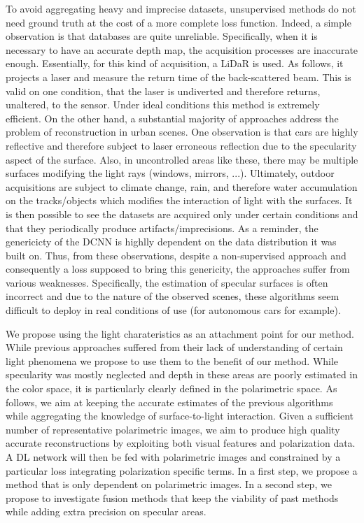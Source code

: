 To avoid aggregating heavy and imprecise datasets, unsupervised methods do not need ground truth at the cost of a more complete loss function. Indeed, a simple observation is that databases are quite unreliable. Specifically, when it is necessary to have an accurate depth map, the acquisition processes are inaccurate enough. Essentially, for this kind of acquisition, a LiDaR is used. As follows, it projects a laser and measure the return time of the back-scattered beam. This is valid on one condition, that the laser is undiverted and therefore returns, unaltered, to the sensor. Under ideal conditions this method is extremely efficient. On the other hand, a substantial majority of approaches address the problem of reconstruction in urban scenes. One observation is that cars are highly reflective and therefore subject to laser erroneous reflection due to the specularity aspect of the surface. Also, in uncontrolled areas like these, there may be multiple surfaces modifying the light rays (windows, mirrors, ...). Ultimately, outdoor acquisitions are subject to climate change, rain, and therefore water accumulation on the tracks/objects which modifies the interaction of light with the surfaces. It is then possible to see the datasets are acquired only under certain conditions and that they periodically produce artifacts/imprecisions.
As a reminder, the genericicty of the DCNN is highlly dependent on the data distribution it was built on. Thus, from these observations, despite a non-supervised approach and consequently a loss supposed to bring this genericity, the approaches suffer from various weaknesses. Specifically, the estimation of specular surfaces is often incorrect and due to the nature of the observed scenes, these algorithms seem difficult to deploy in real conditions of use (for autonomous cars for example).

We propose using the light charateristics as an attachment point for our method. While previous approaches suffered from their lack of understanding of certain light phenomena we propose to use them to the benefit of our method. While specularity was mostly neglected and depth in these areas are poorly estimated in the color space, it is particularly clearly defined in the polarimetric space. As follows, we aim at keeping the accurate estimates of the previous algorithms while aggregating the knowledge of surface-to-light interaction. Given a sufficient number of representative polarimetric images, we aim to produce high quality accurate reconstructions by exploiting both visual features and polarization data.
A DL network will then be fed with polarimetric images and constrained by a particular loss integrating polarization specific terms. In a first step, we propose a method that is only dependent on polarimetric images. In a second step, we propose to investigate fusion methods that keep the viability of past methods while adding extra precision on specular areas. 


